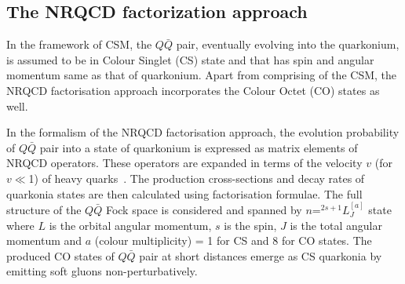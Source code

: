 \subsection{The NRQCD factorization approach}


In the framework of CSM, the $Q\bar{Q}$ pair, eventually evolving into the quarkonium,
is assumed to be in Colour Singlet (CS) state and that has spin and 
angular momentum same as that of quarkonium.
Apart from comprising of the CSM, the NRQCD factorisation approach incorporates 
the Colour Octet (CO) states as well.

In the formalism of the NRQCD factorisation approach, the evolution probability of $Q\bar{Q}$
pair into a state of quarkonium is expressed as matrix elements of NRQCD operators. These operators are expanded
in terms of the velocity $v$ (for $v\ll$1) of heavy quarks~\cite{Bodwin:1994jh}.
The production cross-sections and decay rates of quarkonia states are then calculated using 
factorisation formulae.  %
The full structure of the $Q\bar{Q}$ Fock space
is considered and spanned by $n$=$^{2s+1}L_J^{[a]}$ state where $L$ is the orbital angular momentum, $s$
is the spin, $J$ is the total angular momentum
and $a$ (colour multiplicity) = 1 for CS and 8 for CO states. 
The produced CO states of $Q\bar{Q}$ pair at short distances emerge as 
CS quarkonia by emitting soft gluons non-perturbatively.

